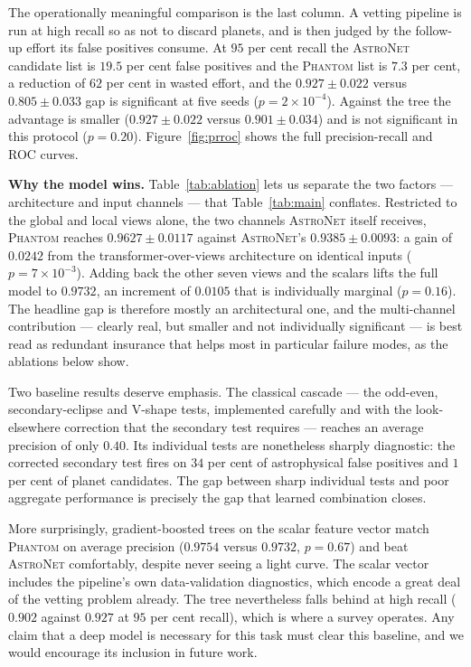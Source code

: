 \documentclass[preprint,12pt,authoryear]{elsarticle}
\newcommand{\phantomnet}{\textsc{Phantom}}
\newcommand{\astronet}{\textsc{AstroNet}}
\begin{document}
The operationally meaningful comparison is the last column. A vetting pipeline
is run at high recall so as not to discard planets, and is then judged by the
follow-up effort its false positives consume. At $95$ per cent recall the
\astronet{} candidate list is $19.5$ per cent false positives and the
\phantomnet{} list is $7.3$ per cent, a reduction of $62$ per cent in wasted
effort, and the $0.927\pm0.022$ versus $0.805\pm0.033$ gap is significant at
five seeds ($p = 2\times10^{-4}$). Against the tree the advantage is smaller
($0.927 \pm 0.022$ versus $0.901 \pm 0.034$) and is not significant in this
protocol ($p = 0.20$). Figure~\ref{fig:prroc} shows the full precision-recall
and ROC curves.

\textbf{Why the model wins.} Table~\ref{tab:ablation} lets us separate the two
factors --- architecture and input channels --- that Table~\ref{tab:main} conflates.
Restricted to the global and local views alone, the two channels \astronet{}
itself receives, \phantomnet{} reaches $0.9627 \pm 0.0117$ against \astronet{}'s
$0.9385 \pm 0.0093$: a gain of $0.0242$ from the transformer-over-views
architecture on identical inputs ($p = 7\times10^{-3}$). Adding back the other
seven views and the scalars lifts the full model to $0.9732$, an increment of
$0.0105$ that is individually marginal ($p = 0.16$). The headline gap is
therefore mostly an architectural one, and the multi-channel contribution ---
clearly real, but smaller and not individually significant --- is best read as
redundant insurance that helps most in particular failure modes, as the
ablations below show.

Two baseline results deserve emphasis. The classical cascade --- the odd-even,
secondary-eclipse and V-shape tests, implemented carefully and with the
look-elsewhere correction that the secondary test requires --- reaches an
average precision of only $0.40$. Its individual tests are nonetheless sharply
diagnostic: the corrected secondary test fires on $34$ per cent of astrophysical
false positives and $1$ per cent of planet candidates. The gap between sharp
individual tests and poor aggregate performance is precisely the gap that
learned combination closes.

More surprisingly, gradient-boosted trees on the scalar feature vector match
\phantomnet{} on average precision ($0.9754$ versus $0.9732$, $p = 0.67$) and
beat \astronet{} comfortably, despite never seeing a light curve. The scalar
vector includes the pipeline's own data-validation diagnostics, which encode a
great deal of the vetting problem already. The tree nevertheless falls behind at
high recall ($0.902$ against $0.927$ at $95$ per cent recall), which is where a
survey operates. Any claim that a deep model is necessary for this task must
clear this baseline, and we would encourage its inclusion in future work.
\end{document}
